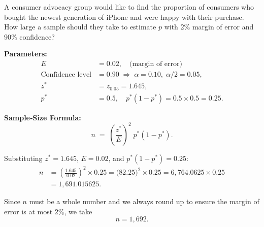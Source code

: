\begin{example}

A consumer advocacy group would like to find the proportion of consumers who bought the newest generation of iPhone and were happy with their purchase. How large a sample should they take to estimate \(p\) with 2\% margin of error and 90\% confidence?


\textbf{Parameters:}
\[
\begin{aligned}
E &= 0.02, \quad\text{(margin of error)}\\
\text{Confidence level} &= 0.90 \;\Longrightarrow\; \alpha = 0.10,\;\alpha/2 = 0.05,\\
z^{*} &= z_{0.05} = 1.645,\\
p^{*} &= 0.5,\quad p^{*}(1 - p^{*}) = 0.5 \times 0.5 = 0.25.
\end{aligned}
\]

\bigskip

\textbf{Sample‐Size Formula:}
\[
n \;=\; \left(\frac{z^{*}}{E}\right)^{2}\;p^{*}(1 - p^{*}).
\]

\noindent Substituting \(z^{*} = 1.645\), \(E = 0.02\), and \(p^{*}(1 - p^{*}) = 0.25\):
\[
\begin{aligned}
n 
&= \left(\frac{1.645}{0.02}\right)^{2} \times 0.25 
= \bigl(82.25\bigr)^{2} \times 0.25 
= 6{,}764.0625 \times 0.25 \\[0.5em]
&= 1{,}691.015625.
\end{aligned}
\]

Since \(n\) must be a whole number and we always round up to ensure the margin of error is at most \(2\%\), we take
\[
n = 1{,}692.
\]
%
%

\end{example}


